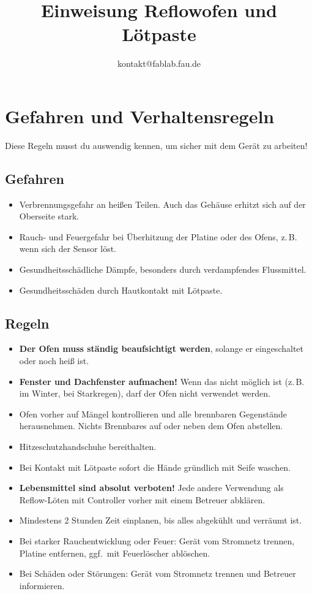 \documentclass{\basedir/fablab-document}
\author{kontakt@fablab.fau.de}
\title{Einweisung Reflowofen und Lötpaste}
\begin{document}
\maketitle

\section{Gefahren und Verhaltensregeln}
Diese Regeln musst du auswendig kennen, um sicher mit dem Gerät zu arbeiten!

\subsection{Gefahren}
\begin{itemize}
	\item Verbrennungsgefahr an heißen Teilen. Auch das Gehäuse erhitzt sich auf der Oberseite stark.
	\item Rauch- und Feuergefahr bei Überhitzung der Platine oder des Ofens, z.\,B. wenn sich der Sensor löst.
	\item Gesundheitsschädliche Dämpfe, besonders durch verdampfendes Flussmittel.
	\item Gesundheitsschäden durch Hautkontakt mit Lötpaste.
\end{itemize}

\subsection{Regeln}
\begin{itemize}
	\item \textbf{Der Ofen muss ständig beaufsichtigt werden}, solange er eingeschaltet oder noch heiß ist.
	\item \textbf{Fenster und Dachfenster aufmachen!} Wenn das nicht möglich ist (z.\,B. im Winter, bei Starkregen), darf der Ofen nicht verwendet werden.
	\item Ofen vorher auf Mängel kontrollieren und alle brennbaren Gegenstände herausnehmen. Nichts Brennbares auf oder neben dem Ofen abstellen.
	\item Hitzeschutzhandschuhe bereithalten.
	\item Bei Kontakt mit Lötpaste sofort die Hände gründlich mit Seife waschen.
	\item \textbf{Lebensmittel sind absolut verboten!} Jede andere Verwendung als Reflow-Löten mit Controller vorher mit einem Betreuer abklären.
	\item Mindestens 2 Stunden Zeit einplanen, bis alles abgekühlt und verräumt ist.
	\item Bei starker Rauchentwicklung oder Feuer: Gerät vom Stromnetz trennen, Platine entfernen, ggf.\ mit Feuerlöscher ablöschen.
	\item Bei Schäden oder Störungen: Gerät vom Stromnetz trennen und Betreuer informieren.
\end{itemize}
\end{document}
